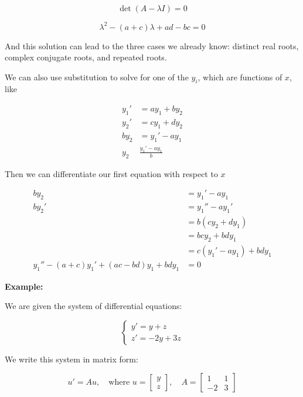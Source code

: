 \[
    \det(A - \lambda I) = 0
\]

\[
    \lambda^{2} - (a + c)\lambda + ad - bc = 0
\]

And this solution can lead to the three cases we already know: distinct real roots, complex conjugate
roots, and repeated roots.

We can also use substitution to solve for one of the \(y_i\), which are functions of \(x\), like

\begin{align*}
    y_1 ' & = ay_1 + by_2         \\
    y_2 ' & = cy_1 + dy_2         \\
    by_2  & = y_1' - ay_1         \\
    y_2   & \frac{y_1' - ay_1}{b}
\end{align*}

Then we can differentiate our first equation with respect to \(x\)

\begin{align*}
    by_2                                       & = y_1' - ay_1             \\
    by_2'                                      & = y_1'' - ay_1'           \\
                                               & = b (cy_2 + dy_1)         \\
                                               & = bcy_2 + bdy_1           \\
                                               & = c (y_1' -ay_1 ) + bdy_1 \\
    y_1'' - (a + c)y_1' + (ac - bd)y_1 + bdy_1 & = 0
\end{align*}

\textbf{Example:}

We are given the system of differential equations:

\[
    \begin{cases}
        y' = y + z \\
        z' = -2y + 3z
    \end{cases}
\]

We write this system in matrix form:

\[
    u' = Au, \quad \text{where } u = \begin{bmatrix} y \\ z \end{bmatrix}, \quad A = \begin{bmatrix} 1 &
                1   \\ -2 & 3\end{bmatrix}
\]

